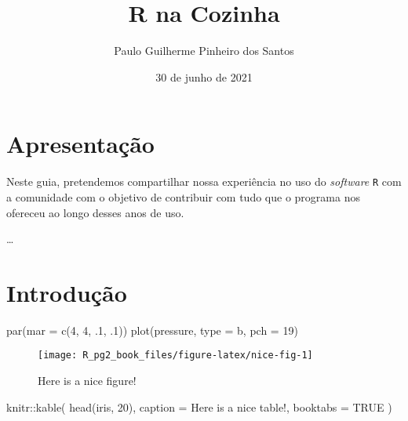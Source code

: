 \documentclass[
  12pt,
  brazilian,
]{book}
\title{R na Cozinha}
\author{Paulo Guilherme Pinheiro dos Santos}
\date{30 de junho de 2021}
\newenvironment{Shaded}{\begin{snugshade}}{\end{snugshade}}
\newcommand{\AttributeTok}[1]{\textcolor[rgb]{0.77,0.63,0.00}{#1}}
\newcommand{\ConstantTok}[1]{\textcolor[rgb]{0.00,0.00,0.00}{#1}}
\newcommand{\DecValTok}[1]{\textcolor[rgb]{0.00,0.00,0.81}{#1}}
\newcommand{\FunctionTok}[1]{\textcolor[rgb]{0.00,0.00,0.00}{#1}}
\newcommand{\NormalTok}[1]{#1}
\newcommand{\SpecialCharTok}[1]{\textcolor[rgb]{0.00,0.00,0.00}{#1}}
\newcommand{\StringTok}[1]{\textcolor[rgb]{0.31,0.60,0.02}{#1}}
\begin{document}
\maketitle

{
\hypersetup{linkcolor=}
\setcounter{tocdepth}{1}
\tableofcontents
}
\hypertarget{apresentauxe7uxe3o}{%
\chapter{Apresentação}\label{apresentauxe7uxe3o}}

Neste guia, pretendemos compartilhar nossa experiência no uso do \emph{software} \texttt{R} com a comunidade com o objetivo de contribuir com tudo que o programa nos ofereceu ao longo desses anos de uso.

\ldots{}

\hypertarget{intro}{%
\chapter{Introdução}\label{intro}}

\begin{Shaded}
\begin{Highlighting}[]
\FunctionTok{par}\NormalTok{(}\AttributeTok{mar =} \FunctionTok{c}\NormalTok{(}\DecValTok{4}\NormalTok{, }\DecValTok{4}\NormalTok{, .}\DecValTok{1}\NormalTok{, .}\DecValTok{1}\NormalTok{))}
\FunctionTok{plot}\NormalTok{(pressure, }\AttributeTok{type =} \StringTok{\textquotesingle{}b\textquotesingle{}}\NormalTok{, }\AttributeTok{pch =} \DecValTok{19}\NormalTok{)}
\end{Highlighting}
\end{Shaded}

\begin{figure}

{\centering \texttt{[image: R\_pg2\_book\_files/figure-latex/nice-fig-1]} 

}

\caption{Here is a nice figure!}\label{fig:nice-fig}
\end{figure}

\begin{Shaded}
\begin{Highlighting}[]
\NormalTok{knitr}\SpecialCharTok{::}\FunctionTok{kable}\NormalTok{(}
  \FunctionTok{head}\NormalTok{(iris, }\DecValTok{20}\NormalTok{), }\AttributeTok{caption =} \StringTok{\textquotesingle{}Here is a nice table!\textquotesingle{}}\NormalTok{,}
  \AttributeTok{booktabs =} \ConstantTok{TRUE}
\NormalTok{)}
\end{Highlighting}
\end{Shaded}
\end{document}
